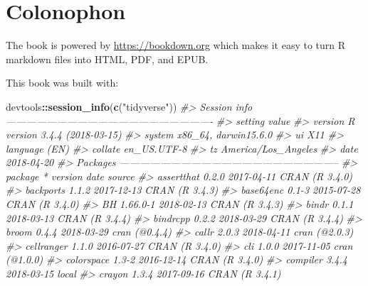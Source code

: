 \documentclass[]{book}
\newenvironment{Shaded}{\begin{snugshade}}{\end{snugshade}}
\newcommand{\CommentTok}[1]{\textcolor[rgb]{0.56,0.35,0.01}{\textit{#1}}}
\newcommand{\KeywordTok}[1]{\textcolor[rgb]{0.13,0.29,0.53}{\textbf{#1}}}
\newcommand{\NormalTok}[1]{#1}
\newcommand{\OperatorTok}[1]{\textcolor[rgb]{0.81,0.36,0.00}{\textbf{#1}}}
\newcommand{\StringTok}[1]{\textcolor[rgb]{0.31,0.60,0.02}{#1}}
\theoremstyle{definition}
\theoremstyle{definition}
\theoremstyle{definition}
\theoremstyle{remark}
\begin{document}
\hypertarget{colonophon}{%
\section*{Colonophon}\label{colonophon}}

The book is powered by \url{https://bookdown.org} which makes it easy to
turn R markdown files into HTML, PDF, and EPUB.

This book was built with:

\begin{Shaded}
\begin{Highlighting}[]
\NormalTok{devtools}\OperatorTok{::}\KeywordTok{session_info}\NormalTok{(}\KeywordTok{c}\NormalTok{(}\StringTok{"tidyverse"}\NormalTok{))}
\CommentTok{#> Session info -------------------------------------------------------------}
\CommentTok{#>  setting  value                       }
\CommentTok{#>  version  R version 3.4.4 (2018-03-15)}
\CommentTok{#>  system   x86_64, darwin15.6.0        }
\CommentTok{#>  ui       X11                         }
\CommentTok{#>  language (EN)                        }
\CommentTok{#>  collate  en_US.UTF-8                 }
\CommentTok{#>  tz       America/Los_Angeles         }
\CommentTok{#>  date     2018-04-20}
\CommentTok{#> Packages -----------------------------------------------------------------}
\CommentTok{#>  package      * version    date       source                          }
\CommentTok{#>  assertthat     0.2.0      2017-04-11 CRAN (R 3.4.0)                  }
\CommentTok{#>  backports      1.1.2      2017-12-13 CRAN (R 3.4.3)                  }
\CommentTok{#>  base64enc      0.1-3      2015-07-28 CRAN (R 3.4.0)                  }
\CommentTok{#>  BH             1.66.0-1   2018-02-13 CRAN (R 3.4.3)                  }
\CommentTok{#>  bindr          0.1.1      2018-03-13 CRAN (R 3.4.4)                  }
\CommentTok{#>  bindrcpp       0.2.2      2018-03-29 CRAN (R 3.4.4)                  }
\CommentTok{#>  broom          0.4.4      2018-03-29 cran (@0.4.4)                   }
\CommentTok{#>  callr          2.0.3      2018-04-11 cran (@2.0.3)                   }
\CommentTok{#>  cellranger     1.1.0      2016-07-27 CRAN (R 3.4.0)                  }
\CommentTok{#>  cli            1.0.0      2017-11-05 cran (@1.0.0)                   }
\CommentTok{#>  colorspace     1.3-2      2016-12-14 CRAN (R 3.4.0)                  }
\CommentTok{#>  compiler       3.4.4      2018-03-15 local                           }
\CommentTok{#>  crayon         1.3.4      2017-09-16 CRAN (R 3.4.1)                  }

\end{Highlighting}
\end{Shaded}
\end{document}
